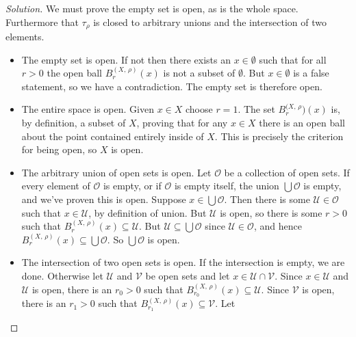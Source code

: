 \documentclass{article}
\theoremstyle{normal}
\begin{document}
    \begin{proof}[Solution]
        We must prove the empty set is open, as is the whole space. Furthermore
        that $\tau_{\rho}$ is closed to arbitrary unions and the intersection
        of two elements.
        \begin{itemize}
            \item The empty set is open. If not then there exists an
                $x\in\emptyset$ such that for all $r>0$ the open ball
                $B_{r}^{(X,\,\rho)}(x)$ is not a subset of $\emptyset$. But
                $x\in\emptyset$ is a false statement, so we have a
                contradiction. The empty set is therefore open.
            \item The entire space is open. Given $x\in{X}$ choose
                $r=1$. The set $B_{r}^{(X,\,\rho})(x)$ is, by definition, a
                subset of $X$, proving that for any $x\in{X}$ there is an open
                ball about the point contained entirely inside of $X$. This is
                precisely the criterion for being open, so $X$ is open.
            \item The arbitrary union of open sets is open. Let
                $\mathcal{O}$ be a collection of open sets. If every element of
                $\mathcal{O}$ is empty, or if $\mathcal{O}$ is empty itself,
                the union $\bigcup\mathcal{O}$ is empty, and we've proven this
                is open. Suppose $x\in\bigcup\mathcal{O}$. Then there is some
                $\mathcal{U}\in\mathcal{O}$ such that $x\in\mathcal{U}$, by
                definition of union. But $\mathcal{U}$ is open, so there is
                some $r>0$ such that
                $B_{r}^{(X,\,\rho)}(x)\subseteq\mathcal{U}$. But
                $\mathcal{U}\subseteq\bigcup\mathcal{O}$ since
                $\mathcal{U}\in\mathcal{O}$, and hence
                $B_{r}^{(X,\,\rho)}(x)\subseteq\bigcup\mathcal{O}$. So
                $\bigcup\mathcal{O}$ is open.
            \item The intersection of two open sets is open. If the intersection
                is empty, we are done. Otherwise let $\mathcal{U}$ and
                $\mathcal{V}$ be open sets and let
                $x\in\mathcal{U}\cap\mathcal{V}$. Since $x\in\mathcal{U}$ and
                $\mathcal{U}$ is open, there is an $r_{0}>0$ such that
                $B_{r_{0}}^{(X,\,\rho)}(x)\subseteq\mathcal{U}$. Since
                $\mathcal{V}$ is open, there is an $r_{1}>0$ such that
                $B_{r_{1}}^{(X,\,\rho)}(x)\subseteq\mathcal{V}$. Let

\end{itemize}
\end{proof}
\end{document}
